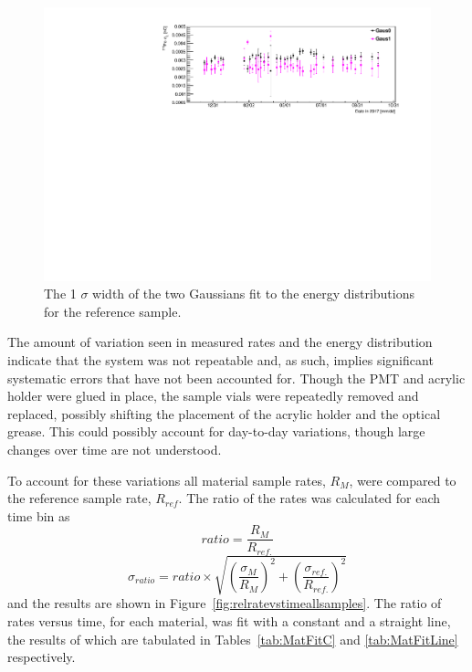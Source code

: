 \begin{figure}[h]
	\centering
	\includegraphics[width=0.9\linewidth]{tex/6-ac227-images/BNL/PoEnWidthVsTime_S2}
	\caption[$\sigma$ width versus time for the reference sample]{The 1 $\sigma$ width of the two Gaussians fit to the \Po energy distributions for the reference sample.}
	\label{fig:poenwidthvstimes2}
\end{figure}

The amount of variation seen in measured rates and the \Po energy distribution indicate that the system was not repeatable and, as such, implies significant systematic errors that have not been accounted for. 
Though the PMT and acrylic holder were glued in place, the sample vials were repeatedly removed and replaced, possibly shifting the placement of the acrylic holder and the optical grease. 
This could possibly account for day-to-day variations, though large changes over time are not understood. 

To account for these variations all material sample rates, $R_M$, were compared to the reference sample rate, $R_{ref}$.
The ratio of the rates was calculated for each time bin as
\begin{equation}
ratio = \frac{R_M}{R_{ref.}}
\end{equation}
\begin{equation}
\sigma_{ratio} = ratio \times \sqrt{\left(\frac{\sigma_{M}}{R_{M}}\right)^2+\left(\frac{\sigma_{ref.}}{R_{ref.}}\right)^2}
\end{equation}
and the results are shown in Figure~\ref{fig:relratevstimeallsamples}.
The ratio of rates versus time, for each material, was fit with a constant and a straight line, the results of which are tabulated in Tables~\ref{tab:MatFitC} and \ref{tab:MatFitLine} respectively.

